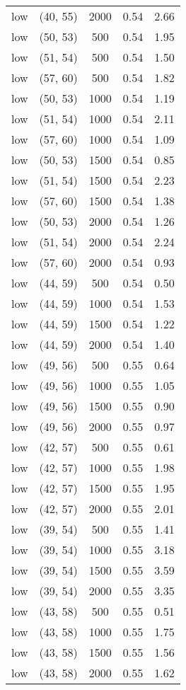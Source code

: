 \begin{tabular}{c c c c c}
low & (40, 55) &  2000 & 0.54 & 2.66 \\
low & (50, 53) &  500 & 0.54 & 1.95 \\
low & (51, 54) &  500 & 0.54 & 1.50 \\
low & (57, 60) &  500 & 0.54 & 1.82 \\
low & (50, 53) &  1000 & 0.54 & 1.19 \\
low & (51, 54) &  1000 & 0.54 & 2.11 \\
low & (57, 60) &  1000 & 0.54 & 1.09 \\
low & (50, 53) &  1500 & 0.54 & 0.85 \\
low & (51, 54) &  1500 & 0.54 & 2.23 \\
low & (57, 60) &  1500 & 0.54 & 1.38 \\
low & (50, 53) &  2000 & 0.54 & 1.26 \\
low & (51, 54) &  2000 & 0.54 & 2.24 \\
low & (57, 60) &  2000 & 0.54 & 0.93 \\
low & (44, 59) &  500 & 0.54 & 0.50 \\
low & (44, 59) &  1000 & 0.54 & 1.53 \\
low & (44, 59) &  1500 & 0.54 & 1.22 \\
low & (44, 59) &  2000 & 0.54 & 1.40 \\
low & (49, 56) &  500 & 0.55 & 0.64 \\
low & (49, 56) &  1000 & 0.55 & 1.05 \\
low & (49, 56) &  1500 & 0.55 & 0.90 \\
low & (49, 56) &  2000 & 0.55 & 0.97 \\
low & (42, 57) &  500 & 0.55 & 0.61 \\
low & (42, 57) &  1000 & 0.55 & 1.98 \\
low & (42, 57) &  1500 & 0.55 & 1.95 \\
low & (42, 57) &  2000 & 0.55 & 2.01 \\
low & (39, 54) &  500 & 0.55 & 1.41 \\
low & (39, 54) &  1000 & 0.55 & 3.18 \\
low & (39, 54) &  1500 & 0.55 & 3.59 \\
low & (39, 54) &  2000 & 0.55 & 3.35 \\
low & (43, 58) &  500 & 0.55 & 0.51 \\
low & (43, 58) &  1000 & 0.55 & 1.75 \\
low & (43, 58) &  1500 & 0.55 & 1.56 \\
low & (43, 58) &  2000 & 0.55 & 1.62 \\

\end{tabular}

